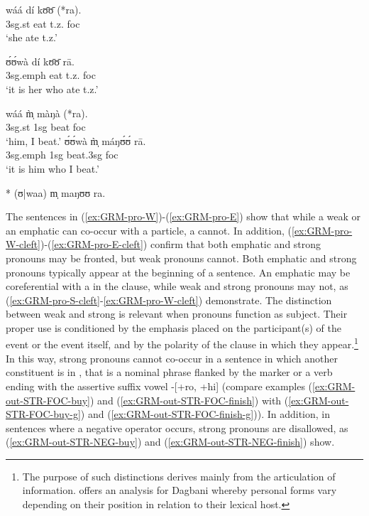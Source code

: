 \begin{exe}
\begin{exe}
\begin{exe}
\begin{exe}
\begin{exe}
\begin{exe}
\begin{exe}
\begin{exe}
   \ex\label{ex:GRM-pro-S}
   \gll wáá dí kʊ̄ʊ̄ (*ra).\\
  {\sc 3sg.st} eat t.z.  {\sc foc}\\
\glt  `{\sc she} ate t.z.' 
   
 \ex\label{ex:GRM-pro-E}  
   \gll ʊ́ʊ́wà dí kʊ̄ʊ̄ rā.\\
  {\sc 3sg.emph} eat t.z.  {\sc foc}\\
\glt  `{\sc it is her} who ate t.z.' 

  \ex\label{ex:GRM-pro-S-cleft}  
   \gll  wáá  m̩̀ màŋà (*ra).\\
  {\sc 3sg.st} {\sc 1sg}  beat  {\sc foc}\\
 \glt   `{\sc him}, I beat.'
  \ex\label{ex:GRM-pro-E-cleft}  
   \gll  ʊ́ʊ́wà  m̩̀ máŋʊ́ʊ́ rā.\\
  {\sc 3sg.emph}  {\sc 1sg}  beat.{\sc 3sg}   {\sc foc}\\
 \glt   `{\sc it is him} who I beat.'
 
 \ex\label{ex:GRM-pro-W-cleft}  
 * (ʊ|waa) m̩ maŋʊʊ ra.
  \z 
  \z
  
The sentences in (\ref{ex:GRM-pro-W})-(\ref{ex:GRM-pro-E}) show that while a weak or an emphatic  can co-occur with a  particle,  a  cannot. In addition, (\ref{ex:GRM-pro-W-cleft})-(\ref{ex:GRM-pro-E-cleft}) confirm that both emphatic and strong pronouns may be fronted, but weak pronouns cannot.  Both emphatic and strong pronouns typically appear  at the beginning of a sentence. An emphatic  may be coreferential with a  in the clause, while weak and strong pronouns may not,  as  (\ref{ex:GRM-pro-S-cleft}-\ref{ex:GRM-pro-W-cleft}) demonstrate.   The  distinction between weak and strong  is relevant when pronouns function as subject.  Their proper use is 
conditioned by the emphasis  placed on the participant(s) of the event or the 
event itself, and by the polarity of the clause in which they appear.\footnote{The purpose of such 
distinctions derives mainly from the articulation of information. \citet{Purv07} offers an analysis 
for Dagbani whereby personal  forms vary depending on their position in relation to their 
lexical host.}  In this way, strong pronouns cannot co-occur in a sentence in which another
constituent is in , that is a nominal phrase flanked by the  marker  or   a verb ending with the assertive suffix vowel   {\sc -[+ro,  +hi]} (compare examples (\ref{ex:GRM-out-STR-FOC-buy}) and (\ref{ex:GRM-out-STR-FOC-finish}) with (\ref{ex:GRM-out-STR-FOC-buy-g}) and  (\ref{ex:GRM-out-STR-FOC-finish-g})). In addition,  in sentences where a negative operator occurs, strong pronouns are disallowed, as  (\ref{ex:GRM-out-STR-NEG-buy}) and   (\ref{ex:GRM-out-STR-NEG-finish}) show.


\end{exe}
\end{exe}
\end{exe}
\end{exe}
\end{exe}
\end{exe}
\end{exe}
\end{exe}
